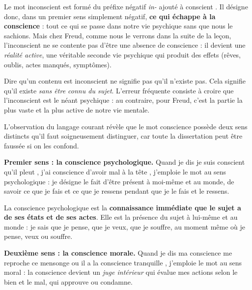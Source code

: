 \documentclass[11pt]{article}
\newcommand{\cle}[1]{{\popxbold\color{popdark}#1}}
\newcounter{popsec}
\newcounter{popsub}
\newcommand{\courssub}[1]{%
  \stepcounter{popsub}%
  \par\vspace{9pt}\noindent{\popxbold\fontsize{11.5}{13}\selectfont\color{popink}{\color{poporange}\thepopsec.\thepopsub}\hspace{6pt}#1}\par\nopagebreak\vspace{4pt}
}
\begin{document}
Le mot \cle{inconscient} est formé du préfixe négatif \emph{in-} ajouté à \og conscient \fg. Il désigne donc, dans un premier sens simplement négatif, \textbf{ce qui échappe à la conscience} : tout ce qui se passe dans notre vie psychique sans que nous le sachions. Mais chez Freud, comme nous le verrons dans la suite de la leçon, l'inconscient ne se contente pas d'être une absence de conscience : il devient une \emph{réalité active}, une véritable \og seconde vie \fg{} psychique qui produit des effets (rêves, oublis, actes manqués, symptômes).

\begin{attention}
Dire qu'un contenu est \og inconscient \fg{} ne signifie pas qu'il n'existe pas. Cela signifie qu'il existe \emph{sans être connu du sujet}. L'erreur fréquente consiste à croire que l'inconscient est le néant psychique : au contraire, pour Freud, c'est la partie la plus vaste et la plus active de notre vie mentale.
\end{attention}

\courssub{Les deux sens du mot « conscience »}

L'observation du langage courant révèle que le mot \og conscience \fg{} possède deux sens distincts qu'il faut soigneusement distinguer, car toute la dissertation peut être faussée si on les confond.

\textbf{Premier sens : la conscience psychologique.} Quand je dis \og je suis conscient qu'il pleut \fg, \og j'ai conscience d'avoir mal à la tête \fg, j'emploie le mot au sens psychologique : je désigne le fait d'être présent à moi-même et au monde, de savoir ce que je fais et ce que je ressens pendant que je le fais et le ressens.

\begin{definition}
La \cle{conscience psychologique} est la \textbf{connaissance immédiate que le sujet a de ses états et de ses actes}. Elle est la présence du sujet à lui-même et au monde : je sais que je pense, que je veux, que je souffre, au moment même où je pense, veux ou souffre.
\end{definition}

\textbf{Deuxième sens : la conscience morale.} Quand je dis \og ma conscience me reproche ce mensonge \fg{} ou \og il a la conscience tranquille \fg, j'emploie le mot au sens moral : la conscience devient un \emph{juge intérieur} qui évalue mes actions selon le bien et le mal, qui approuve ou condamne.
\end{document}
